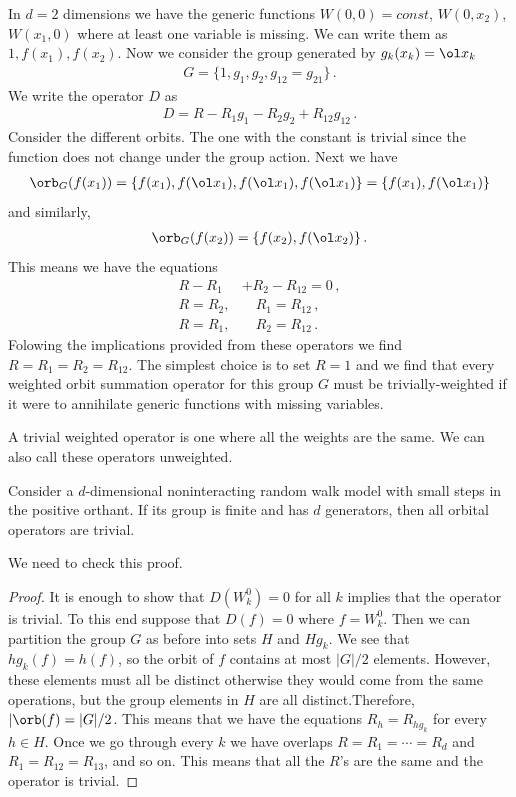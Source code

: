 \begin{example} In $d = 2$ dimensions we have the generic functions $W(0,0) = const$, $W(0,x_2)$, $W(x_1,0)$ where at least one variable is missing. We can write them as $1, f(x_1), f(x_2)$. Now we consider the group generated by $g_k(x_k) = \ol x_k$
\begin{align}
	G = \{1, g_1, g_2, g_{12} = g_{21}\}\,.
\end{align}
We write the operator $D$ as 
\begin{align}
	D = R - R_1 g_1 - R_2 g_2 + R_{12} g_{12}\,.
\end{align}
Consider the different orbits. The one with the constant is trivial since the function does not change under the group action. Next we have
\begin{align}
	\orb_G(f(x_1)) = \{f(x_1),f(\ol x_1),f(\ol x_1), f(\ol x_1)\} = \{f(x_1),f(\ol x_1)\}
\end{align}
and similarly,
\begin{align}
	\orb_G(f(x_2)) = \{f(x_2),f(\ol x_2)\}\,.
\end{align}
This means we have the equations
\begin{align}
	R - R_1 &+ R_2 - R_{12} = 0\,,\\
	R = R_2, &\quad R_1 = R_{12}\,,\\
	R = R_1, &\quad R_2 = R_{12}\,.
\end{align}
Folowing the implications provided from these operators we find $R= R_1 = R_2 = R_{12}$. The simplest choice is to set $R = 1$ and we find that every weighted orbit summation operator for this group $G$ must be trivially-weighted if it were to annihilate generic functions with missing variables.
\end{example}
\begin{definition} A trivial weighted operator is one where all the weights are the same. We can also call these operators unweighted.
\end{definition}
\begin{lemma} Consider a $d$-dimensional noninteracting random walk model with small steps in the positive orthant. If its group is finite and has $d$ generators, then all orbital operators are trivial.
\end{lemma}
We need to check this proof.
\begin{proof}It is enough to show that $D(W_k^0) = 0$ for all $k$ implies that the operator is trivial. To this end suppose that $D(f) = 0$ where $f = W_k^0$. Then we can partition the group $G$ as before into sets $H$ and $Hg_k$. We see that $hg_k (f) = h(f)$, so the orbit of $f$ contains at most $|G|/2$ elements. However, these elements must all be distinct otherwise they would come from the same operations, but the group elements in $H$ are all distinct.Therefore, $|\orb(f) = |G|/2$. This means that we have the equations $R_h = R_{hg_k}$ for every $h \in H$. Once we go through every $k$ we have overlaps $R = R_1 =\cdots = R_d$ and $R_1 = R_{12} = R_{13}$, and so on. This means that all the $R$'s are the same and the operator is trivial.
\end{proof}
